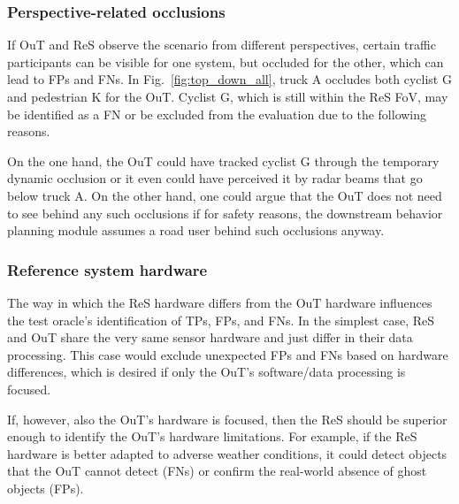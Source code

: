 \documentclass[conference]{IEEEtran}
\begin{document}

\subsubsection{Perspective-related occlusions}
\label{sec:occlusions}

If OuT and ReS observe the scenario from different perspectives, certain traffic participants can be visible for one system, but occluded for the other, which can lead to FPs and FNs. 
In Fig.~\ref{fig:top_down_all}, truck A occludes both cyclist G and pedestrian K for the OuT. 
Cyclist G, which is still within the ReS FoV, may be identified as a FN or be excluded from the evaluation due to the following reasons. 

On the one hand, the OuT could have tracked cyclist G through the temporary dynamic occlusion or it even could have perceived it by radar beams that go below truck A. 
On the other hand, one could argue that the OuT does not need to see behind any such occlusions if for safety reasons, the downstream behavior planning module assumes a road user behind such occlusions anyway.




\subsubsection{Reference system hardware}
\label{sec:ref_hw}

The way in which the ReS hardware differs from the OuT hardware influences the test oracle's identification of TPs, FPs, and FNs. 
In the simplest case, ReS and OuT share the very same sensor hardware and just differ in their data processing. 
This case would exclude unexpected FPs and FNs based on hardware differences, which is desired if only the OuT's software/data processing is focused. 

If, however, also the OuT's hardware is focused, then the ReS should be superior enough to identify the OuT's hardware limitations. 
For example, if the ReS hardware is better adapted to adverse weather conditions, it could detect objects that the OuT cannot detect (FNs) or confirm the real-world absence of ghost objects (FPs). 
\end{document}
